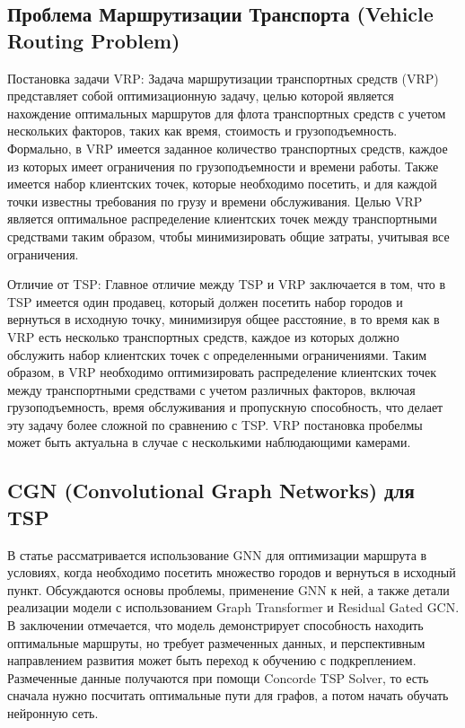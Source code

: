 \subsection{Проблема Маршрутизации Транспорта (Vehicle Routing Problem)}

Постановка задачи VRP:
Задача маршрутизации транспортных средств (VRP) представляет собой оптимизационную задачу, целью которой является нахождение оптимальных маршрутов для флота транспортных средств с учетом нескольких факторов, таких как время, стоимость и грузоподъемность. Формально, в VRP имеется заданное количество транспортных средств, каждое из которых имеет ограничения по грузоподъемности и времени работы. Также имеется набор клиентских точек, которые необходимо посетить, и для каждой точки известны требования по грузу и времени обслуживания. Целью VRP является оптимальное распределение клиентских точек между транспортными средствами таким образом, чтобы минимизировать общие затраты, учитывая все ограничения.

Отличие от TSP:
Главное отличие между TSP и VRP заключается в том, что в TSP имеется один продавец, который должен посетить набор городов и вернуться в исходную точку, минимизируя общее расстояние, в то время как в VRP есть несколько транспортных средств, каждое из которых должно обслужить набор клиентских точек с определенными ограничениями. Таким образом, в VRP необходимо оптимизировать распределение клиентских точек между транспортными средствами с учетом различных факторов, включая грузоподъемность, время обслуживания и пропускную способность, что делает эту задачу более сложной по сравнению с TSP. VRP постановка пробелмы может быть актуальна в случае с несколькими наблюдающими камерами.

\subsection{CGN (Convolutional Graph Networks) для TSP}
 В статье \cite{gnn} рассматривается использование GNN для оптимизации маршрута в условиях, когда необходимо посетить множество городов и вернуться в исходный пункт. Обсуждаются основы проблемы, применение GNN к ней, а также детали реализации модели с использованием Graph Transformer и Residual Gated GCN. В заключении отмечается, что модель демонстрирует способность находить оптимальные маршруты, но требует размеченных данных, и перспективным направлением развития может быть переход к обучению с подкреплением. Размеченные данные получаются при помощи Concorde TSP Solver, то есть сначала нужно посчитать оптимальные пути для графов, а потом начать обучать нейронную сеть. 
 